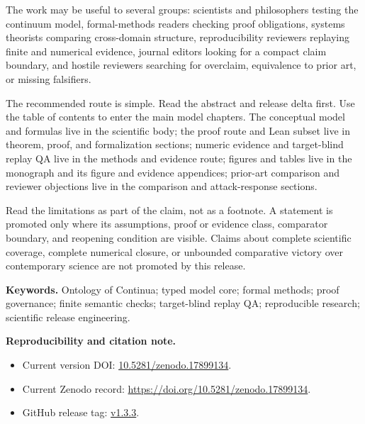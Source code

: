 The work may be useful to several groups: scientists and philosophers testing
the continuum model, formal-methods readers checking proof obligations, systems
theorists comparing cross-domain structure, reproducibility reviewers replaying
finite and numerical evidence, journal editors looking for a compact claim
boundary, and hostile reviewers searching for overclaim, equivalence to prior
art, or missing falsifiers.

The recommended route is simple. Read the abstract and release delta first.
Use the table of contents to enter the main model chapters. The conceptual
model and formulas live in the scientific body; the proof route and Lean subset
live in theorem, proof, and formalization sections; numeric evidence and
target-blind replay QA live in the methods and evidence route; figures and
tables live in the monograph and its figure and evidence appendices; prior-art
comparison and reviewer objections live in the comparison and attack-response
sections.

Read the limitations as part of the claim, not as a footnote. A statement is
promoted only where its assumptions, proof or evidence class, comparator
boundary, and reopening condition are visible. Claims about complete scientific
coverage, complete numerical closure, or unbounded comparative victory over
contemporary science are not promoted by this release.

\clearpage
\noindent\textbf{Keywords.}
Ontology of Continua; typed model core; formal methods; proof governance;
finite semantic checks; target-blind replay QA; reproducible research;
scientific release engineering.

\clearpage
\noindent\textbf{Reproducibility and citation note.}
\begin{itemize}[leftmargin=1.6em,nosep]
\item Current version DOI: \href{https://doi.org/10.5281/zenodo.17899134}{10.5281/zenodo.17899134}.
\item Current Zenodo record: \href{https://doi.org/10.5281/zenodo.17899134}{https://doi.org/10.5281/zenodo.17899134}.
\item GitHub release tag: \href{https://github.com/alexanderyashin/ontology-of-continua-core-main/releases/tag/v1.3.3}{v1.3.3}.
\end{itemize}

\clearpage

